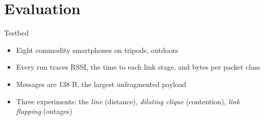 \section{Evaluation}
\begin{frame}{Testbed}
    \begin{itemize}
        \item Eight commodity smartphones on tripods, outdoors
        \item Every run traces RSSI, the time to each link stage, and bytes per packet class
        \item Messages are 138 B, the largest unfragmented payload
        \item Three experiments: the \emph{line} (distance), \emph{diluting clique} (contention), \emph{link flapping} (outages)
    \end{itemize}
\end{frame}

